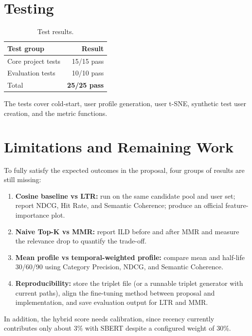 \documentclass[12pt,a4paper]{article}
\begin{document}
\section{Testing}

\begin{table}[H]
\centering
\caption{Test results.}\label{tab:tests}
\begin{tabular}{lr}
\toprule
\textbf{Test group} & \textbf{Result}\\
\midrule
Core project tests & 15/15 pass\\
Evaluation tests & 10/10 pass\\
Total & \textbf{25/25 pass}\\
\bottomrule
\end{tabular}
\end{table}

The tests cover cold-start, user profile generation, user t-SNE, synthetic test
user creation, and the metric functions.

\section{Limitations and Remaining Work}

To fully satisfy the expected outcomes in the proposal, four groups of results
are still missing:
\begin{enumerate}[leftmargin=1.6em]
  \item \textbf{Cosine baseline vs LTR:} run on the same candidate pool and user
  set; report NDCG, Hit Rate, and Semantic Coherence; produce an official
  feature-importance plot.
  \item \textbf{Naive Top-K vs MMR:} report ILD before and after MMR and measure
  the relevance drop to quantify the trade-off.
  \item \textbf{Mean profile vs temporal-weighted profile:} compare mean and
  half-life 30/60/90 using Category Precision, NDCG, and Semantic Coherence.
  \item \textbf{Reproducibility:} store the triplet file (or a runnable triplet
  generator with current paths), align the fine-tuning method between proposal
  and implementation, and save evaluation output for LTR and MMR.
\end{enumerate}

In addition, the hybrid score needs calibration, since recency currently
contributes only about 3\% with SBERT despite a configured weight of 30\%.
\end{document}
